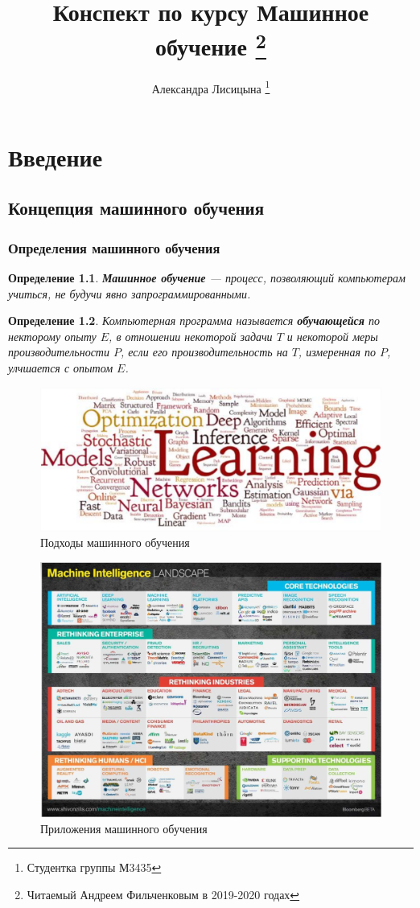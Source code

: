 \documentclass[10pt,a4paper,oneside,titlepage]{report}
\title{Конспект по курсу Машинное обучение \thanks{Читаемый Андреем Фильченковым в 2019-2020 годах}}
\author{Александра Лисицына \thanks{Студентка группы М3435}}
\theoremstyle{defenition}
\newtheorem*{defenition}{Определение}
\theoremstyle{theorem}
\begin{document}
	
\maketitle

\tableofcontents

\clearpage	

\chapter{Введение}

\section{Концепция машинного обучения}

\subsection{Определения машинного обучения}

\begin{defenition}
	{\bfseries Машинное обучение} --- процесс, позволяющий компьютерам учиться, не будучи явно запрограммированными.
\end{defenition}

\begin{defenition}
	Компьютерная программа называется {\bfseries обучающейся} по некторому опыту $E$, в отношении некоторой задачи $T$ и некоторой меры производительности $P$, если его производительность на $T$, измеренная по $P$, улчшается с опытом $E$.
\end{defenition}

\begin{figure}[h!]
	\centering
	\includegraphics[width=0.7\linewidth]{pictures/MLApproaches}
	\caption{Подходы машинного обучения}
	\label{fig:mlapproaches}
\end{figure}

\begin{figure}[h!]
	\centering
	\includegraphics[width=0.7\linewidth]{pictures/MLApplications}
	\caption{Приложения машинного обучения}
	\label{fig:mlapplications}
\end{figure}
\end{document}
